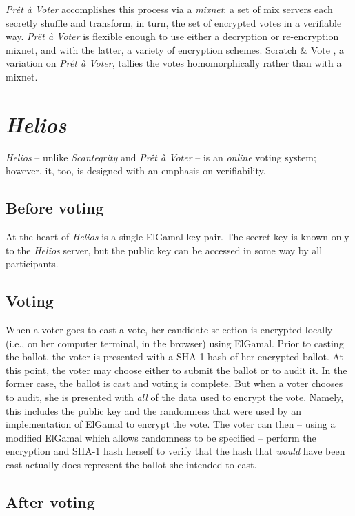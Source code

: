 \documentclass[10pt,twocolumn]{article}
\newcommand{\term}[1]{\textit{#1}}
\newcommand{\preta}{Pr\^{e}t \`{a}}
\newcommand{\pv}{\preta{} Voter}
\begin{document}
\term{\pv{}} accomplishes this process via a \term{mixnet}: a set of mix servers each secretly shuffle and transform, in turn, the set of encrypted votes in a verifiable way.
\term{\pv{}} is flexible enough to use either a decryption or re-encryption mixnet, and with the latter, a variety of encryption schemes.
Scratch \& Vote \cite{scratch}, a variation on \term{\pv}, tallies the votes homomorphically rather than with a mixnet.

\section{\term{Helios}}

\term{Helios} \cite{helios} -- unlike \term{Scantegrity} and \term{\pv{}} -- is an \emph{online} voting
system; however, it, too, is designed with an emphasis on verifiability.

\subsection{Before voting}

At the heart of \term{Helios} is a single ElGamal key pair. The secret key is known only to the \term{Helios}
server, but the public key can be accessed in some way by all participants.

\subsection{Voting}

When a voter goes to cast a vote, her candidate selection is encrypted locally (i.e., on her
computer terminal, in the browser) using ElGamal. Prior to casting the ballot, the voter is
presented with a SHA-1 hash of her encrypted ballot. At this point, the voter may choose either
to submit the ballot or to audit it. In the former case, the ballot is cast and voting is
complete. But when a voter chooses to audit, she is presented with \emph{all} of the data
used to encrypt the vote. Namely, this includes the public key and the randomness that were used
by an implementation of ElGamal to encrypt the vote. The voter can then -- using a modified ElGamal
which allows randomness to be specified -- perform the encryption and SHA-1 hash herself
to verify that the hash that \emph{would} have been cast actually does represent the ballot she
intended to cast.

\subsection{After voting}
\end{document}

